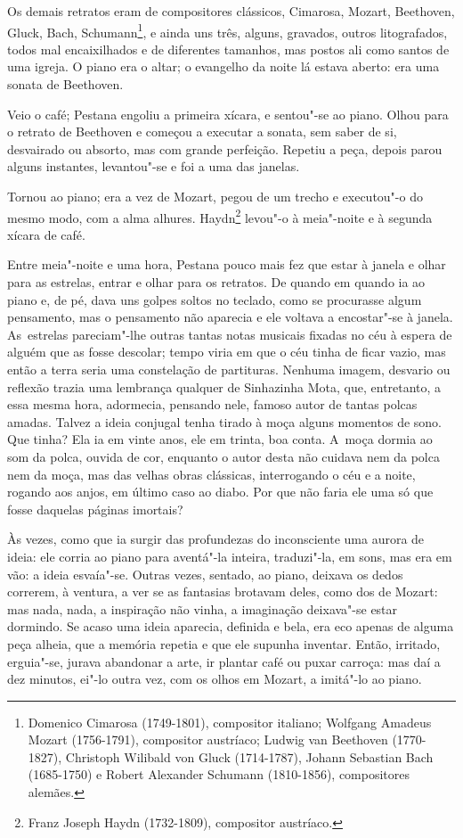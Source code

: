 Os demais retratos eram de compositores clássicos, Cimarosa, Mozart,
Beethoven, Gluck, Bach, Schumann\footnote{Domenico Cimarosa (1749-1801),
  compositor italiano; Wolfgang Amadeus Mozart (1756-1791), compositor
  austríaco; Ludwig van Beethoven (1770-1827), Christoph Wilibald von
  Gluck (1714-1787), Johann Sebastian Bach (1685-1750) e Robert
  Alexander Schumann (1810-1856), compositores alemães.}, e ainda uns
três, alguns, gravados, outros litografados, todos mal encaixilhados e
de diferentes tamanhos, mas postos ali como santos de uma igreja. O
piano era o altar; o evangelho da noite lá estava aberto: era uma sonata
de Beethoven.

Veio o café; Pestana engoliu a primeira xícara, e sentou"-se ao piano.
Olhou para o retrato de Beethoven e começou a executar a sonata, sem
saber de si, desvairado ou absorto, mas com grande perfeição. Repetiu a
peça, depois parou alguns instantes, levantou"-se e foi a uma das
janelas.

Tornou ao piano; era a vez de Mozart, pegou de um trecho e executou"-o do
mesmo modo, com a alma alhures. Haydn\footnote{Franz Joseph Haydn
  (1732-1809), compositor austríaco.} levou"-o à meia"-noite e à segunda
xícara de café.

Entre meia"-noite e uma hora, Pestana pouco mais fez que estar à janela e
olhar para as estrelas, entrar e olhar para os retratos. De quando em
quando ia ao piano e, de pé, dava uns golpes soltos no teclado, como se
procurasse algum pensamento, mas o pensamento não aparecia e ele voltava
a encostar"-se à janela. As~estrelas pareciam"-lhe outras tantas notas
musicais fixadas no céu à espera de alguém que as fosse descolar; tempo
viria em que o céu tinha de ficar vazio, mas então a terra seria uma
constelação de partituras. Nenhuma imagem, desvario ou reflexão trazia
uma lembrança qualquer de Sinhazinha Mota, que, entretanto, a essa mesma
hora, adormecia, pensando nele, famoso autor de tantas polcas amadas.
Talvez a ideia conjugal tenha tirado à moça alguns momentos de sono. Que
tinha? Ela ia em vinte anos, ele em trinta, boa conta. A~moça dormia ao
som da polca, ouvida de cor, enquanto o autor desta não cuidava nem da
polca nem da moça, mas das velhas obras clássicas, interrogando o céu e
a noite, rogando aos anjos, em último caso ao diabo. Por que não faria
ele uma só que fosse daquelas páginas imortais?

Às vezes, como que ia surgir das profundezas do inconsciente uma aurora
de ideia: ele corria ao piano para aventá"-la inteira, traduzi"-la, em
sons, mas era em vão: a ideia esvaía"-se. Outras vezes, sentado, ao
piano, deixava os dedos correrem, à ventura, a ver se as fantasias
brotavam deles, como dos de Mozart: mas nada, nada, a inspiração não
vinha, a imaginação deixava"-se estar dormindo. Se acaso uma ideia
aparecia, definida e bela, era eco apenas de alguma peça alheia, que a
memória repetia e que ele supunha inventar. Então, irritado, erguia"-se,
jurava abandonar a arte, ir plantar café ou puxar carroça: mas daí a dez
minutos, ei"-lo outra vez, com os olhos em Mozart, a imitá"-lo ao piano.

